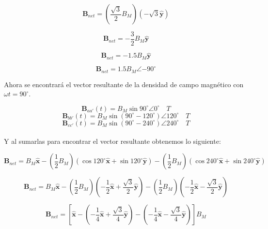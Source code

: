 \documentclass[12pt,a4paper,openany]{article}
\begin{document}
	\begin{equation*}
		\mathbf{B}_{net}=\left(\frac{\sqrt{3}}{2} B_{M}\right)\left( -\sqrt{3}\mathbf{\hat{y}} \right)
	\end{equation*}
	
	\begin{equation*}
		\mathbf{B}_{net}=-\frac{3}{2}B_M\mathbf{\hat{y}}
	\end{equation*}
	
	\begin{equation*}
		\mathbf{B}_{net}=-1.5B_M\mathbf{\hat{y}}
	\end{equation*}
	
	\begin{equation*}
		\mathbf{B}_{net}=1.5B_M\angle{-90^{\circ}}
	\end{equation*}
	
	Ahora se encontrará el vector resultante de la densidad de campo magnético con $\omega t=90^{\circ}$.
	
	\begin{equation*}
	\mathbf{B}_{aa'}(t)=B_{M}\sin 90^{\circ} \angle{0^{\circ}} \quad T
	\end{equation*}
	\begin{equation*}
	\mathbf{B}_{bb'}(t)=B_{M}\sin (90^{\circ} - 120^{\circ}) \angle{120^{\circ}} \quad T
	\end{equation*}
	\begin{equation*}
	\mathbf{B}_{cc'}(t)=B_{M}\sin (90^{\circ} - 240^{\circ}) \angle{240^{\circ}} \quad T
	\end{equation*}	
	\\
	Y al sumarlas para encontrar el vector resultante obtenemos lo siguiente:
	
	\begin{equation*}
		\mathbf{B}_{net}=B_M\mathbf{\hat{x}}-\left(\frac{1}{2}B_M\right)\left(\cos120^{\circ}\mathbf{\hat{x}}+\sin120^{\circ}\mathbf{\hat{y}}\right)-\left(\frac{1}{2}B_M\right)\left(\cos240^{\circ}\mathbf{\hat{x}}+\sin240^{\circ}\mathbf{\hat{y}}\right)
	\end{equation*}
	
	\begin{equation*}
		\mathbf{B}_{net}=B_M\mathbf{\hat{x}}-\left(\frac{1}{2}B_M\right)\left(-\frac{1}{2}\mathbf{\hat{x}}+\frac{\sqrt{3}}{2}\mathbf{\hat{y}}\right)-\left(\frac{1}{2}B_M\right)\left(-\frac{1}{2}\mathbf{\hat{x}}-\frac{\sqrt{3}}{2}\mathbf{\hat{y}}\right)
	\end{equation*}
	
	\begin{equation*}
		\mathbf{B}_{net}=\left[\mathbf{\hat{x}}-\left(-\frac{1}{4}\mathbf{\hat{x}}+\frac{\sqrt{3}}{4}\mathbf{\hat{y}}\right)-\left(-\frac{1}{4}\mathbf{\hat{x}}-\frac{\sqrt{3}}{4}\mathbf{\hat{y}}\right)\right]B_M
	\end{equation*}
	
\end{document}
